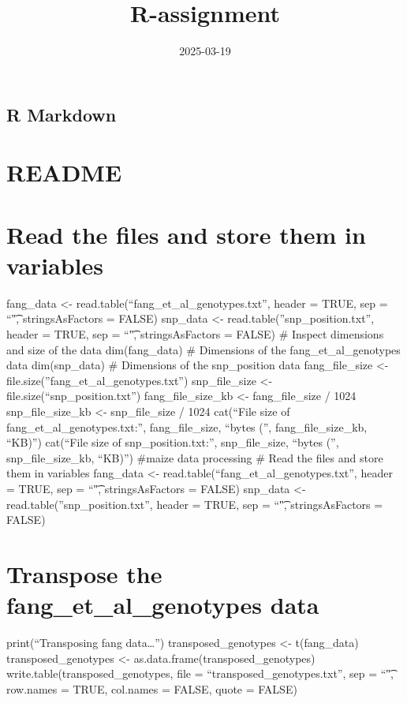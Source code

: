 \documentclass[
]{article}
\title{R-assignment}
\author{}
\date{\vspace{-2.5em}2025-03-19}
\begin{document}
\maketitle

\subsection{R Markdown}\label{r-markdown}

\section{README}\label{readme}

\section{Read the files and store them in
variables}\label{read-the-files-and-store-them-in-variables}

fang\_data \textless- read.table(``fang\_et\_al\_genotypes.txt'', header
= TRUE, sep = ``\t", stringsAsFactors = FALSE) snp\_data \textless-
read.table(''snp\_position.txt'', header = TRUE, sep = ``\t",
stringsAsFactors = FALSE) \# Inspect dimensions and size of the data
dim(fang\_data) \# Dimensions of the fang\_et\_al\_genotypes data
dim(snp\_data) \# Dimensions of the snp\_position data fang\_file\_size
\textless- file.size(''fang\_et\_al\_genotypes.txt'') snp\_file\_size
\textless- file.size(``snp\_position.txt'') fang\_file\_size\_kb
\textless- fang\_file\_size / 1024 snp\_file\_size\_kb \textless-
snp\_file\_size / 1024 cat(``File size of
fang\_et\_al\_genotypes.txt:'', fang\_file\_size, ``bytes ('',
fang\_file\_size\_kb, ``KB)\n'') cat(``File size of
snp\_position.txt:'', snp\_file\_size, ``bytes ('', snp\_file\_size\_kb,
``KB)\n'') \#maize data processing \# Read the files and store them in
variables fang\_data \textless-
read.table(``fang\_et\_al\_genotypes.txt'', header = TRUE, sep = ``\t",
stringsAsFactors = FALSE) snp\_data \textless-
read.table(''snp\_position.txt'', header = TRUE, sep = ``\t",
stringsAsFactors = FALSE)

\section{Transpose the fang\_et\_al\_genotypes
data}\label{transpose-the-fang_et_al_genotypes-data}

print(``Transposing fang data\ldots{}'') transposed\_genotypes
\textless- t(fang\_data) transposed\_genotypes \textless-
as.data.frame(transposed\_genotypes) write.table(transposed\_genotypes,
file = ``transposed\_genotypes.txt'', sep = ``\t", row.names = TRUE,
col.names = FALSE, quote = FALSE)
\end{document}
